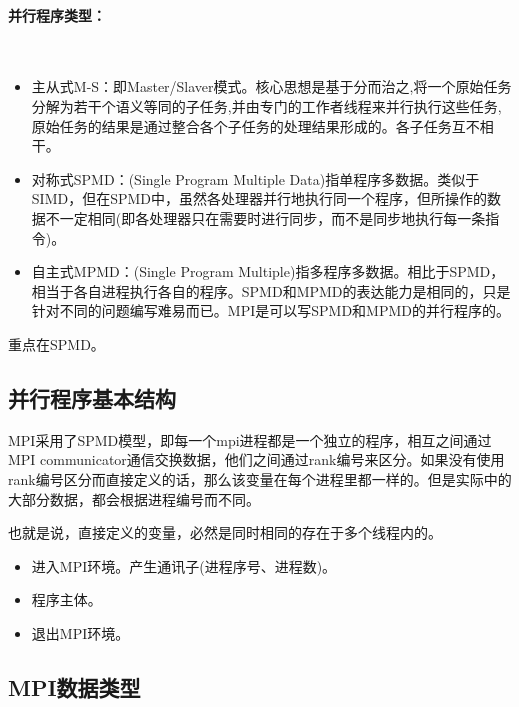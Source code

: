 \documentclass[UTF8]{article}%
\begin{document}
\paragraph{并行程序类型：}~{}

\begin{itemize}
    \item 主从式M-S：即Master/Slaver模式。核心思想是基于分而治之,将一个原始任务分解为若干个语义等同的子任务,并由专门的工作者线程来并行执行这些任务,原始任务的结果是通过整合各个子任务的处理结果形成的。各子任务互不相干。
    \item 对称式SPMD：(Single Program Multiple Data)指单程序多数据。类似于SIMD，但在SPMD中，虽然各处理器并行地执行同一个程序，但所操作的数据不一定相同(即各处理器只在需要时进行同步，而不是同步地执行每一条指令)。
    \item 自主式MPMD：(Single Program Multiple)指多程序多数据。相比于SPMD，相当于各自进程执行各自的程序。SPMD和MPMD的表达能力是相同的，只是针对不同的问题编写难易而已。MPI是可以写SPMD和MPMD的并行程序的。
\end{itemize}

重点在SPMD。

\subsection{并行程序基本结构}

MPI采用了SPMD模型，即每一个mpi进程都是一个独立的程序，相互之间通过MPI communicator通信交换数据，他们之间通过rank编号来区分。如果没有使用rank编号区分而直接定义的话，那么该变量在每个进程里都一样的。但是实际中的大部分数据，都会根据进程编号而不同。

也就是说，直接定义的变量，必然是同时相同的存在于多个线程内的。

\begin{itemize}
    \item 进入MPI环境。产生通讯子(进程序号、进程数)。
    \item 程序主体。
    \item 退出MPI环境。
\end{itemize}



\subsection{MPI数据类型}
\end{document}
